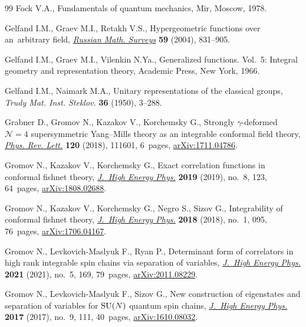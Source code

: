 \documentclass[10pt,a4paper]{amsart}
\numberwithin{equation}{section}
\begin{document}
\begin{thebibliography}{99}
Fock V.A., Fundamentals of quantum mechanics, Mir, Moscow, 1978.

Gelfand I.M., Graev M.I., Retakh V.S., Hypergeometric functions over
 an~arbitrary field,
 \href{https://doi.org/10.1070/RM2004v059n05ABEH000771}{\textit{Russian Math.
 Surveys}} \textbf{59} (2004), 831--905.

Gelfand I.M., Graev M.I., Vilenkin N.Ya., Generalized functions. {V}ol.~5:
 {I}ntegral geometry and representation theory, Academic Press, New York,
 1966.

Gelfand I.M., Naimark M.A., Unitary representations of the classical groups,
 \textit{Trudy Mat. Inst. Steklov.} \textbf{36} (1950), 3--288.

Grabner D., Gromov N., Kazakov V., Korchemsky G., Strongly {$\gamma$}-deformed
 {$\mathcal{N}=4$} supersymmetric {Y}ang--{M}ills theory as an integrable
 conformal field theory,
 \href{https://doi.org/10.1103/PhysRevLett.120.111601}{\textit{Phys. Rev.
 Lett.}} \textbf{120} (2018), 111601, 6~pages,
 \href{http://arxiv.org/abs/1711.04786}{arXiv:1711.04786}.

Gromov N., Kazakov V., Korchemsky G., Exact correlation functions in conformal
 fishnet theory,
 \href{https://doi.org/10.1007/jhep08(2019)123}{\textit{J.~High Energy Phys.}}
 \textbf{2019} (2019), no.~8, 123, 64~pages,
 \href{http://arxiv.org/abs/1808.02688}{arXiv:1808.02688}.

Gromov N., Kazakov V., Korchemsky G., Negro S., Sizov G., Integrability of
 conformal fishnet theory,
 \href{https://doi.org/10.1007/jhep01(2018)095}{\textit{J.~High Energy Phys.}}
 \textbf{2018} (2018), no.~1, 095, 76~pages,
 \href{http://arxiv.org/abs/1706.04167}{arXiv:1706.04167}.

Gromov N., Levkovich-Maslyuk F., Ryan P., Determinant form of correlators in
 high rank integrable spin chains via separation of variables,
 \href{https://doi.org/10.1007/jhep05(2021)169}{\textit{J.~High Energy Phys.}}
 \textbf{2021} (2021), no.~5, 169, 79~pages,
 \href{http://arxiv.org/abs/2011.08229}{arXiv:2011.08229}.

Gromov N., Levkovich-Maslyuk F., Sizov G., New construction of eigenstates and
 separation of variables for {${\rm SU}(N)$} quantum spin chains,
 \href{https://doi.org/10.1007/jhep09(2017)111}{\textit{J.~High Energy Phys.}}
 \textbf{2017} (2017), no.~9, 111, 40~pages,
 \href{http://arxiv.org/abs/1610.08032}{arXiv:1610.08032}.


\end{thebibliography}
\end{document}
